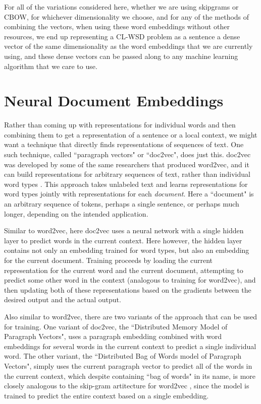 For all of the variations considered here, whether we are using skipgrams or
CBOW, for whichever dimensionality we choose, and for any of the methods of
combining the vectors, when using these word embeddings without other
resources, we end up representing a CL-WSD problem as a sentence a dense vector
of the same dimensionality as the word embeddings that we are currently using,
and these dense vectors can be passed along to any machine learning algorithm
that we care to use.

\section{Neural Document Embeddings}
Rather than coming up with representations for individual words and then
combining them to get a representation of a sentence or a local context, we
might want a technique that directly finds representations of sequences of
text. One such technique, called ``paragraph vectors" or ``doc2vec", does just
this. doc2vec was developed by some of the same researchers that produced
word2vec, and it can build representations for arbitrary sequences of text,
rather than individual word types
\cite{dai-document-embedding-2015,quocle-distributed-representations-2014}.
This approach takes unlabeled text and learns representations for word types
jointly with representations for each \emph{document}. Here a ``document" is an
arbitrary sequence of tokens, perhaps a single sentence, or perhaps much
longer, depending on the intended application.

Similar to word2vec, here doc2vec uses a neural network with a single hidden
layer to predict words in the current context. Here however, the hidden layer
contains not only an embedding trained for word types, but also an embedding
for the current document. Training proceeds by loading the current
representation for the current word and the current document, attempting to
predict some other word in the context (analogous to training for word2vec),
and then updating both of these representations based on the gradients between
the desired output and the actual output. 

Also similar to word2vec, there are two variants of the approach that can be
used for training. One variant of doc2vec, the ``Distributed Memory Model of
Paragraph Vectors", uses a paragraph embedding combined with word embeddings
for several words in the current context to predict a single individual word.
The other variant, the ``Distributed Bag of Words model of Paragraph Vectors",
simply uses the current paragraph vector to predict all of the words in the
current context, which despite containing ``bag of words" in its name, is more
closely analogous to the skip-gram artitecture for word2vec
\cite{quocle-distributed-representations-2014}, since the model is trained to
predict the entire context based on a single embedding.


